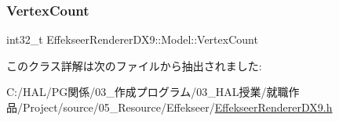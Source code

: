 \mbox{\label{class_effekseer_renderer_d_x9_1_1_model_a2ce7d9a13cdc07992bd3b9ca90eefb55}} 
\subsubsection{\texorpdfstring{Vertex\+Count}{VertexCount}}
{\footnotesize\ttfamily int32\+\_\+t Effekseer\+Renderer\+D\+X9\+::\+Model\+::\+Vertex\+Count}



このクラス詳解は次のファイルから抽出されました\+:\begin{DoxyCompactItemize}
\item 
C\+:/\+H\+A\+L/\+P\+G関係/03\+\_\+作成プログラム/03\+\_\+\+H\+A\+L授業/就職作品/\+Project/source/05\+\_\+\+Resource/\+Effekseer/\mbox{\hyperlink{_effekseer_renderer_d_x9_8h}{Effekseer\+Renderer\+D\+X9.\+h}}\end{DoxyCompactItemize}
